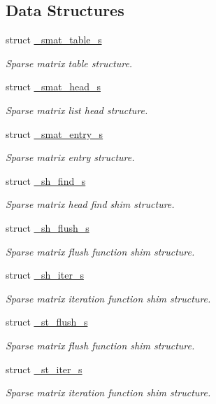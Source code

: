 \subsection*{Data Structures}
\begin{CompactItemize}
\item 
struct \hyperlink{struct__smat__table__s}{\_\-smat\_\-table\_\-s}
\begin{CompactList}\small\item\em Sparse matrix table structure. \item\end{CompactList}\item 
struct \hyperlink{struct__smat__head__s}{\_\-smat\_\-head\_\-s}
\begin{CompactList}\small\item\em Sparse matrix list head structure. \item\end{CompactList}\item 
struct \hyperlink{struct__smat__entry__s}{\_\-smat\_\-entry\_\-s}
\begin{CompactList}\small\item\em Sparse matrix entry structure. \item\end{CompactList}\item 
struct \hyperlink{struct__sh__find__s}{\_\-sh\_\-find\_\-s}
\begin{CompactList}\small\item\em Sparse matrix head find shim structure. \item\end{CompactList}\item 
struct \hyperlink{struct__sh__flush__s}{\_\-sh\_\-flush\_\-s}
\begin{CompactList}\small\item\em Sparse matrix flush function shim structure. \item\end{CompactList}\item 
struct \hyperlink{struct__sh__iter__s}{\_\-sh\_\-iter\_\-s}
\begin{CompactList}\small\item\em Sparse matrix iteration function shim structure. \item\end{CompactList}\item 
struct \hyperlink{struct__st__flush__s}{\_\-st\_\-flush\_\-s}
\begin{CompactList}\small\item\em Sparse matrix flush function shim structure. \item\end{CompactList}\item 
struct \hyperlink{struct__st__iter__s}{\_\-st\_\-iter\_\-s}
\begin{CompactList}\small\item\em Sparse matrix iteration function shim structure. \item\end{CompactList}\end{CompactItemize}
